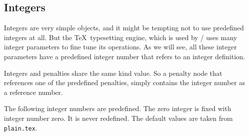 
\subsection{Integers}
Integers are very simple objects, and it might be tempting not to
use predefined integers at all. But the \TeX\ typesetting engine,
which is used by \HINT/ uses many integer parameters to fine tune
its operations. As we will see, all these integer parameters have a predefined
integer number that refers to an integer definition.

Integers and penalties share the same kind value. So a penalty node that references
one of the predefined penalties, simply contains the integer number as a reference
number.

The following integer numbers are predefined.
The zero integer is fixed with integer number zero. It is never redefined.
The default values are taken from {\tt plain.tex}.

